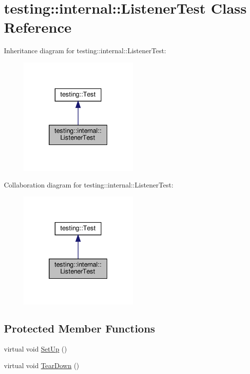 \hypertarget{classtesting_1_1internal_1_1_listener_test}{}\section{testing\+:\+:internal\+:\+:Listener\+Test Class Reference}
\label{classtesting_1_1internal_1_1_listener_test}


Inheritance diagram for testing\+:\+:internal\+:\+:Listener\+Test\+:
\nopagebreak
\begin{figure}[H]
\begin{center}
\leavevmode
\includegraphics[width=169pt]{classtesting_1_1internal_1_1_listener_test__inherit__graph}
\end{center}
\end{figure}


Collaboration diagram for testing\+:\+:internal\+:\+:Listener\+Test\+:
\nopagebreak
\begin{figure}[H]
\begin{center}
\leavevmode
\includegraphics[width=169pt]{classtesting_1_1internal_1_1_listener_test__coll__graph}
\end{center}
\end{figure}
\subsection*{Protected Member Functions}
\begin{DoxyCompactItemize}
\item 
virtual void \hyperlink{classtesting_1_1internal_1_1_listener_test_ace3dbe36b705ddf320518e6cdd919bc8}{Set\+Up} ()
\item 
virtual void \hyperlink{classtesting_1_1internal_1_1_listener_test_ad112535025d668e3ea14e71d8741c810}{Tear\+Down} ()
\end{DoxyCompactItemize}
